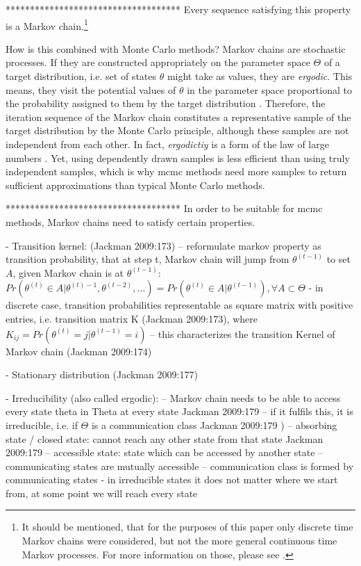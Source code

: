 \documentclass[11pt]{article}
\begin{document}
************************************
Every sequence satisfying this property is a Markov chain.\footnote{It should be mentioned, that for the purposes of this paper only discrete time Markov chains were considered, but not the more general continuous time Markov processes. For more information on those, please see \textcite[][172ff]{jackman2009}.} 

How is this combined with Monte Carlo methods?
Markov chains are stochastic processes. If they are constructed appropriately on the parameter space $\Theta$ of a target distribution, i.e. set of states $\theta$ might take as values, they are \textit{ergodic}. This means, they visit the potential values of $\theta$ in the parameter space proportional to the probability assigned to them by the target distribution \parencite[][172]{jackman2009}. Therefore, the iteration sequence of the Markov chain constitutes a representative sample of the target distribution by the Monte Carlo principle, although these samples are not independent from each other. In fact, \textit{ergodictiy} is a form of the law of large numbers \parencite[][171]{jackman2009}. Yet, using dependently drawn samples is less efficient than using truly independent samples, which is why \gls{mcmc} methods need more samples to return sufficient approximations than typical Monte Carlo methods.

************************************
In order to be suitable for \gls{mcmc} methods, Markov chains need to satisfy certain properties.

- Transition kernel: (Jackman 2009:173)
-- reformulate markov property as transition probability, that at step t, Markov chain will
	jump from $\theta^{(t-1)}$ to set $A$, given Markov chain is at $\theta^{(t-1)}$:
	$Pr(\theta^{(t)} \in A | \theta^{(t)-1}, \theta^{(t-2)}, \dots) = Pr(\theta^{(t)} \in A | \theta^{(t-1)}), \forall A \subset \Theta$
- in discrete case, transition probabilities representable as square matrix with positive entries, i.e. transition matrix K (Jackman 2009:173),
	where$ K_{ij} = Pr(\theta^{(t)} = j | \theta^{(t-1)} = i)$
-- this characterizes the transition Kernel of Markov chain (Jackman 2009:174)
	
- Stationary distribution (Jackman 2009:177)

- Irreducibility (also called ergodic):
-- Markov chain needs to be able to access every state theta in Theta at every state Jackman 2009:179
-- if it fulfils this, it is irreducible, i.e. if $\Theta$ is a communication class Jackman 2009:179 )
-- absorbing state / closed state: cannot reach any other state from that state Jackman 2009:179
-- accessible state: state which can be accessed by another state
-- communicating states are mutually accessible
-- communication class is formed by communicating states
- in irreducible states it does not matter where we start from, at some point we will reach
	every state
	
\end{document}
